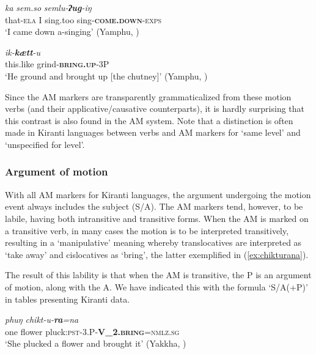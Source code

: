 \documentclass[oneside,a4paper,11pt]{article}
\newcommand{\ipa}[1]{{\phon\textit{#1}}}
\newcommand{\sens}[1]{‘#1’}
\newcommand{\rouge}[1]{\textbf{#1}}
\begin{document}
\begin{exe}
\ex \label{ex:semluuging}
 \gll \ipa{mo.ba}	\ipa{ka}	\ipa{sem.so}	\ipa{semlu-\rouge{ʔug}-iŋ} \\
that-\textsc{ela} I sing.too sing-\textsc{\rouge{come.down}}-\textsc{exps} \\
\glt \sens{I came down a-singing} (Yamphu, \citealt[143]{rutgers98yamphu})
\end{exe}

\begin{exe}
\ex \label{ex:ikkaettu}
 \gll \ipa{i.doʔ}	\ipa{ik-\rouge{kætt}-u} \\
this.like grind-\textsc{\rouge{bring.up}}-3P \\
\glt \sens{He ground and brought up [the chutney]} (Yamphu, \citealt[144]{rutgers98yamphu})
\end{exe}

 Since the AM markers are transparently grammaticalized from these motion verbs (and their applicative/causative counterparts), it is hardly surprising that this contrast is also found in the AM system.
Note that a distinction is often made in Kiranti languages between verbs and AM markers for `same level' and `unspecified for level'.

 

  \subsubsection{Argument of motion} \label{sec:argument.khaling}
With all AM markers for Kiranti languages, the argument undergoing the motion event always includes the subject (S/A).  The AM markers tend, however, to be labile, having both intransitive and transitive forms.  When the AM is marked on a transitive verb, in many cases the motion is to be interpreted transitively, resulting in a `manipulative' meaning whereby translocatives are interpreted as `take away' and cislocatives as `bring', the latter exemplified in (\ref{ex:chikturana}).

The result of this lability is that when the AM is transitive, the P is an argument of motion, along with the A.
We have indicated this with the formula `S/A(+P)' in tables presenting Kiranti data.
 
\begin{exe}
\ex \label{ex:chikturana}
 \gll  \ipa{eko}	\ipa{phuŋ}	\ipa{chikt-u-\rouge{ra}=na} \\
one flower pluck:\textsc{pst}-3.P-\rouge{V_2.\textsc{bring}}=\textsc{nmlz.sg} \\
\glt \sens{She plucked a flower and brought it} (Yakkha, \citealt[312]{schackow15yakkha})
\end{exe}
\end{document}
